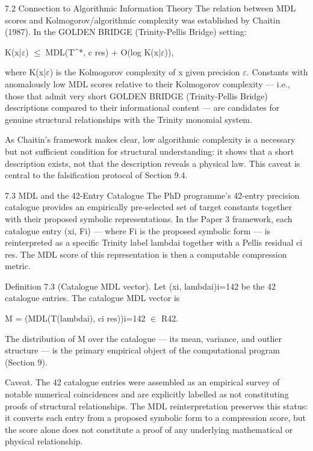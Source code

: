   7.2 Connection to Algorithmic Information Theory
  The relation between MDL scores and Kolmogorov/algorithmic complexity was
  established by Chaitin (1987). In the GOLDEN BRIDGE (Trinity-Pellis Bridge) setting:

  K(x|$\varepsilon$) $\leq$ MDL(T^*, c res) + O(log K(x|$\varepsilon$)),

  where K(x|$\varepsilon$) is the Kolmogorov complexity of x given precision $\varepsilon$. Constants with
  anomalously low MDL scores relative to their Kolmogorov complexity --- i.e., those that
  admit very short GOLDEN BRIDGE (Trinity-Pellis Bridge) descriptions compared to their informational content ---
  are candidates for genuine structural relationships with the Trinity monomial system.

  As Chaitin's framework makes clear, low algorithmic complexity is a necessary but not
  sufficient condition for structural understanding: it shows that a short description
  exists, not that the description reveals a physical law. This caveat is central to the
  falsification protocol of Section 9.4.

  7.3 MDL and the 42-Entry Catalogue
  The PhD programme's 42-entry precision catalogue provides an empirically
  pre-selected set of target constants together with their proposed symbolic
  representations. In the Paper 3 framework, each catalogue entry (xi, Fi) --- where Fi is
  the proposed symbolic form --- is reinterpreted as a specific Trinity label lambdai
  together with a Pellis residual ci res. The MDL score of this representation is then a
  computable compression metric.

        Definition 7.3 (Catalogue MDL vector). Let {(xi, lambdai)}i=142 be the 42
        catalogue entries. The catalogue MDL vector is

  M = (MDL(T(lambdai), ci res))i=142 $\in$ R42.

  The distribution of M over the catalogue --- its mean, variance, and outlier structure ---
  is the primary empirical object of the computational program (Section 9).

  Caveat. The 42 catalogue entries were assembled as an empirical survey of notable
  numerical coincidences and are explicitly labelled as not constituting proofs of
  structural relationships. The MDL reinterpretation preserves this status: it converts
  each entry from a proposed symbolic form to a compression score, but the score alone
  does not constitute a proof of any underlying mathematical or physical relationship.

